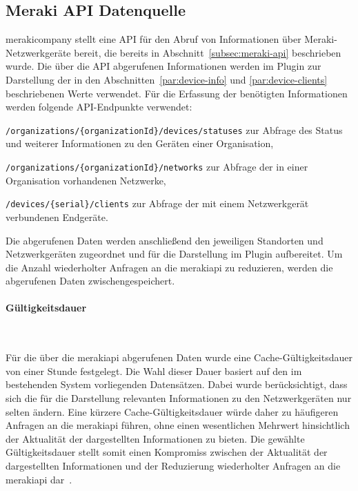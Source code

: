 \subsection{Meraki API Datenquelle}
\label{subsec:meraki-ds-api}

\gls{merakicompany} stellt eine API für den Abruf von Informationen über
Meraki-Netzwerkgeräte bereit, die bereits in Abschnitt~\ref{subsec:meraki-api}
beschrieben wurde. Die über die API abgerufenen Informationen werden im
Plugin zur Darstellung der in den Abschnitten~\ref{par:device-info} und
\ref{par:device-clients} beschriebenen Werte verwendet.
Für die Erfassung der benötigten Informationen werden folgende API-Endpunkte
verwendet:

\begin{compactitem}
    \item \texttt{/organizations/\{organizationId\}/devices/statuses}
    zur Abfrage des Status und weiterer Informationen zu den Geräten einer
    Organisation,
    \item \texttt{/organizations/\{organizationId\}/networks}
    zur Abfrage der in einer Organisation vorhandenen Netzwerke,
    \item \texttt{/devices/\{serial\}/clients}
    zur Abfrage der mit einem Netzwerkgerät verbundenen Endgeräte.
\end{compactitem}

Die abgerufenen Daten werden anschließend den jeweiligen Standorten und
Netzwerkgeräten zugeordnet und für die Darstellung im Plugin aufbereitet.
Um die Anzahl wiederholter Anfragen an die \gls{merakiapi} zu reduzieren,
werden die abgerufenen Daten zwischengespeichert.

\paragraph{Gültigkeitsdauer}
\label{par:meraki-validation-time}

~

Für die über die \gls{merakiapi} abgerufenen Daten wurde eine
Cache-Gültigkeitsdauer von einer Stunde festgelegt. Die Wahl dieser Dauer
basiert auf den im bestehenden System vorliegenden Datensätzen. Dabei wurde
berücksichtigt, dass sich die für die Darstellung relevanten Informationen
zu den Netzwerkgeräten nur selten ändern. Eine kürzere
Cache-Gültigkeitsdauer würde daher zu häufigeren Anfragen an die
\gls{merakiapi} führen, ohne einen wesentlichen Mehrwert hinsichtlich der
Aktualität der dargestellten Informationen zu bieten.
Die gewählte Gültigkeitsdauer stellt somit einen Kompromiss zwischen der
Aktualität der dargestellten Informationen und der Reduzierung wiederholter
Anfragen an die \gls{merakiapi} dar~\cite{grafana2026datasourcecaching}.

